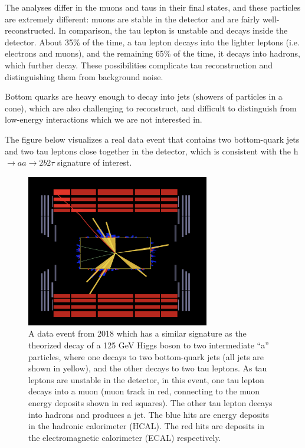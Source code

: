 \documentclass{article}
\begin{document}
The analyses differ in the muons and taus in their final states, and these particles are extremely different: muons are stable in the detector and are fairly well-reconstructed. 
In comparison, the tau lepton is unstable and decays inside the detector. About 35\% of the time, a tau lepton decays into the lighter leptons (i.e. electrons and muons), and the remaining 65\% of the time, it decays into hadrons, 
which further decay. These possibilities complicate tau reconstruction and distinguishing them from background noise. 

Bottom quarks are heavy enough to decay into jets (showers of particles in a cone), which are also challenging to reconstruct, and difficult to distinguish from low-energy interactions which we are not interested in.

The figure below visualizes a real data event that contains two bottom-quark jets and two tau leptons close together in the detector, which is consistent with the h $\rightarrow aa \rightarrow 2b2\tau$ signature of interest.

\begin{figure}[h]
    \centering
    \includegraphics[width=8cm]{fireworks_event1/event1_barrel_slice.png}
    \caption{A data event from 2018 which has a similar signature as the theorized decay of a 125 GeV Higgs boson to two intermediate ``a'' particles, where one decays to two bottom-quark jets (all jets are shown in yellow), 
    and the other decays to two tau leptons. As tau leptons are unstable in the detector, in this event, one tau lepton decays into a muon (muon track in red, connecting to the muon energy deposits shown in red squares).
    The other tau lepton decays into hadrons and produces a jet.
    The blue hits are energy deposits in the hadronic calorimeter (HCAL). The red hits are deposits in the electromagnetic calorimeter (ECAL) respectively.}
\end{figure}
\end{document}
